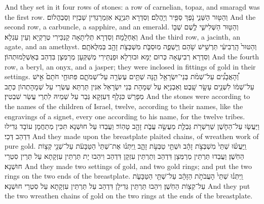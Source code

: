 {{And they set in it four rows of stones: a row of carnelian, topaz, and smaragd was the first row.}{}
{וְהַטּ֖וּר הַשֵּׁנִ֑י נֹ֥פֶךְ סַפִּ֖יר וְיָהֲלֹֽם׃}
{וְסִדְרָא תִּנְיָנָא אִזְמַרַגְדִּין שַׁבְזֵיז וְסַבְהֲלוֹם׃}
{And the second row, a carbuncle, a sapphire, and an emerald.}{}
{וְהַטּ֖וּר הַשְּׁלִישִׁ֑י לֶ֥שֶׁם שְׁב֖וֹ וְאַחְלָֽמָה׃}
{וְסִדְרָא תְּלִיתָאָה קַנְכֵּירִי טְרַקְיָא וְעֵין עִגְלָא׃}
{And the third row, a jacinth, an agate, and an amethyst.}{}
{וְהַטּוּר֙ הָֽרְבִיעִ֔י תַּרְשִׁ֥ישׁ שֹׁ֖הַם וְיָשְׁפֵ֑ה מֽוּסַבֹּ֛ת מִשְׁבְּצֹ֥ת זָהָ֖ב בְּמִלֻּאֹתָֽם׃}
{וְסִדְרָא רְבִיעָאָה כְּרוּם יַמָּא וּבוּרְלָא וּפַנְתֵּירִי מְשַׁקְּעָן מְרַמְּצָן בִּדְהַב בְּאַשְׁלָמוּתְהוֹן׃}
{And the fourth row, a beryl, an onyx, and a jasper; they were inclosed in fittings of gold in their settings.}{}
{וְ֠הָאֲבָנִ֠ים עַל־שְׁמֹ֨ת בְּנֵי־יִשְׂרָאֵ֥ל הֵ֛נָּה שְׁתֵּ֥ים עֶשְׂרֵ֖ה עַל־שְׁמֹתָ֑ם פִּתּוּחֵ֤י חֹתָם֙ אִ֣ישׁ עַל־שְׁמ֔וֹ לִשְׁנֵ֥ים עָשָׂ֖ר שָֽׁבֶט׃}
{וְאַבְנַיָּא עַל שְׁמָהָת בְּנֵי יִשְׂרָאֵל אִנִּין תַּרְתַּא עֶשְׂרֵי עַל שְׁמָהָתְהוֹן כְּתָב מְפָרַשׁ כִּגְלָף דְּעִזְקָא גְּבַר עַל שְׁמֵיהּ לִתְרֵי עֲשַׂר שִׁבְטִין׃}
{And the stones were according to the names of the children of Israel, twelve, according to their names, like the engravings of a signet, every one according to his name, for the twelve tribes.}{}
{וַיַּעֲשׂ֧וּ עַל־הַחֹ֛שֶׁן שַׁרְשְׁרֹ֥ת גַּבְלֻ֖ת מַעֲשֵׂ֣ה עֲבֹ֑ת זָהָ֖ב טָהֽוֹר׃}
{וַעֲבַדוּ עַל חוּשְׁנָא תִּכִּין מְתַחֲמָן עוֹבָד גְּדִילוּ דִּדְהַב דְּכֵי׃}
{And they made upon the breastplate plaited chains, of wreathen work of pure gold.}{}
{וַֽיַּעֲשׂ֗וּ שְׁתֵּי֙ מִשְׁבְּצֹ֣ת זָהָ֔ב וּשְׁתֵּ֖י טַבְּעֹ֣ת זָהָ֑ב וַֽיִּתְּנ֗וּ אֶת־שְׁתֵּי֙ הַטַּבָּעֹ֔ת עַל־שְׁנֵ֖י קְצ֥וֹת הַחֹֽשֶׁן׃}
{וַעֲבַדוּ תַּרְתֵּין מְרַמְּצָן דִּדְהַב וְתַרְתֵּין עִזְקָן דִּדְהַב וִיהַבוּ יָת תַּרְתֵּין עִזְקָתָא עַל תְּרֵין סִטְרֵי חוּשְׁנָא׃}
{And they made two settings of gold, and two gold rings; and put the two rings on the two ends of the breastplate.}{}
{וַֽיִּתְּנ֗וּ שְׁתֵּי֙ הָעֲבֹתֹ֣ת הַזָּהָ֔ב עַל־שְׁתֵּ֖י הַטַּבָּעֹ֑ת עַל־קְצ֖וֹת הַחֹֽשֶׁן׃}
{וִיהַבוּ תַּרְתֵּין גְּדִילָן דִּדְהַב עַל תַּרְתֵּין עִזְקָתָא עַל סִטְרֵי חוּשְׁנָא׃}
{And they put the two wreathen chains of gold on the two rings at the ends of the breastplate.}{}
}
